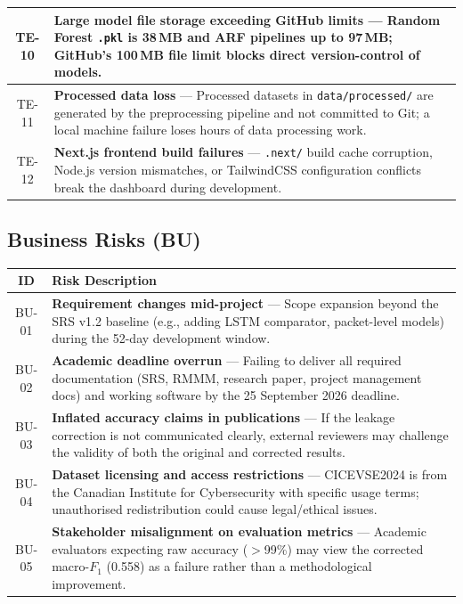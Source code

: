 \documentclass[11pt, a4paper]{article}
\newcommand{\col}[1]{\texttt{\small #1}}
\begin{document}
\begin{longtable}{|c|p{13cm}|}
\hline
TE-10 & \textbf{Large model file storage exceeding GitHub limits} --- Random Forest \col{.pkl} is 38\,MB and ARF pipelines up to 97\,MB; GitHub's 100\,MB file limit blocks direct version-control of models. \\
\hline
TE-11 & \textbf{Processed data loss} --- Processed datasets in \col{data/processed/} are generated by the preprocessing pipeline and not committed to Git; a local machine failure loses hours of data processing work. \\
\hline
TE-12 & \textbf{Next.js frontend build failures} --- \col{.next/} build cache corruption, Node.js version mismatches, or TailwindCSS configuration conflicts break the dashboard during development. \\
\hline
\end{longtable}
\normalsize

\subsection{Business Risks (BU)}

\small
\begin{longtable}{|c|p{13cm}|}
\hline
\rowcolor{orange!10}
\textbf{ID} & \textbf{Risk Description} \\
\hline
\endfirsthead

BU-01 & \textbf{Requirement changes mid-project} --- Scope expansion beyond the SRS v1.2 baseline (e.g., adding LSTM comparator, packet-level models) during the 52-day development window. \\
\hline
BU-02 & \textbf{Academic deadline overrun} --- Failing to deliver all required documentation (SRS, RMMM, research paper, project management docs) and working software by the 25 September 2026 deadline. \\
\hline
BU-03 & \textbf{Inflated accuracy claims in publications} --- If the leakage correction is not communicated clearly, external reviewers may challenge the validity of both the original and corrected results. \\
\hline
BU-04 & \textbf{Dataset licensing and access restrictions} --- CICEVSE2024 is from the Canadian Institute for Cybersecurity with specific usage terms; unauthorised redistribution could cause legal/ethical issues. \\
\hline
BU-05 & \textbf{Stakeholder misalignment on evaluation metrics} --- Academic evaluators expecting raw accuracy ($>$99\%) may view the corrected macro-$F_1$ (0.558) as a failure rather than a methodological improvement. \\
\hline
\end{longtable}
\normalsize
\end{document}
